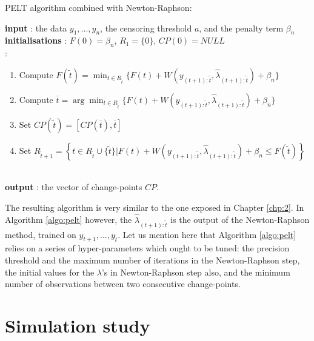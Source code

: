 \begin{algorithm}
\caption{PELT algorithm combined with Newton-Raphson:}\label{algo:pelt}
\begin{algorithmic}

\State \textbf{input} : the data $y_{1},...,y_{n}$, the censoring threshold $a$,  and the penalty term $\beta_{n}$ \\
  
\State \textbf{initialisations} : $F(0)=\beta_{n}$, $R_{1}=\lbrace 0\rbrace$, $CP(0)=NULL$  \\
  
  :
 \begin{enumerate}
  \item Compute 
  $ F(\tilde t)=\min_{t\in R_{\tilde t}}\lbrace F(t)+W(y_{(t+1):\tilde t}, \hat \lambda_{(t+1):\tilde t})+\beta_{n}\rbrace $
  \item Compute $ \overline t=\arg \min_{t\in R_{\tilde t}}\lbrace F(t)+W(y_{(t+1):\tilde t}, \hat \lambda_{(t+1):\tilde t})+\beta_{n}\rbrace $ 
  \item Set $CP(\tilde t)=[CP(\overline t), \overline t]$
  \item Set $R_{\tilde t+1}=\left\{t\in R_{\tilde t}\cup \lbrace\tilde t\rbrace \vert F(t)+W(y_{(t+1):\tilde t}, \hat \lambda_{(t+1):\tilde t}) +\beta_{n} \le F(\tilde t)   \right\}$ 
 \end{enumerate} 
   \EndFor \\
   
\State \textbf{output} : the vector of change-points $CP$. 
 
\end{algorithmic}
\end{algorithm} 

The resulting algorithm is very similar to the one exposed in Chapter \ref{chp:2}. In Algorithm \ref{algo:pelt} however, the $\hat \lambda_{(t+1):\tilde t}$ is the output of the Newton-Raphson method, trained on $y_{t+1},...,y_{\tilde t}$. Let us mention here that Algorithm \ref{algo:pelt} relies on a series of hyper-parameters which ought to be tuned: the precision threshold and the maximum number of iterations in the Newton-Raphson step, the initial values for the $\lambda$’s in Newton-Raphson step also, and the minimum number of observations between two consecutive change-points. 

\section{Simulation study}

